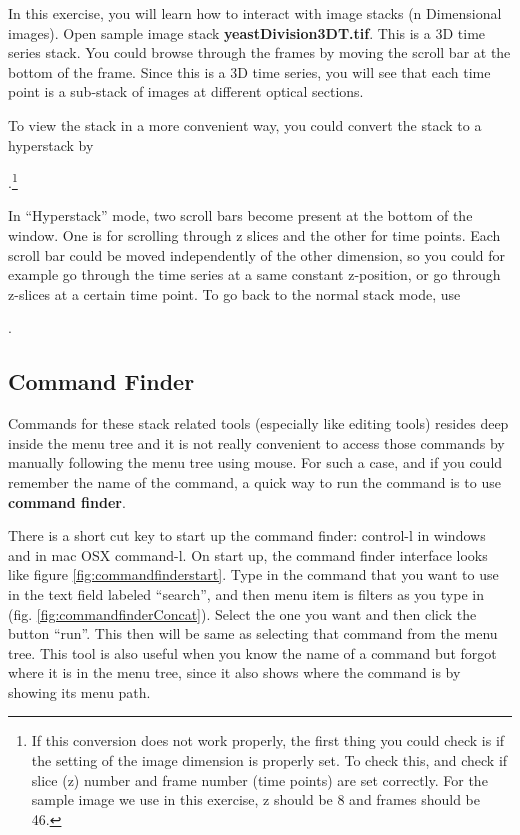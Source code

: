 \begin{indentexercise}{2}
  In this exercise, you will learn how to interact with image stacks (n
  Dimensional images).
  Open sample image stack \textbf{yeastDivision3DT.tif}.
  This is a 3D time series stack. You could browse through the frames by moving
  the scroll bar at the bottom of the frame.
  Since this is a 3D time series, you will see that each time point is a
  sub-stack of images at different optical sections. 
  
  To view the stack in a more
  convenient way, you could convert the stack to a hyperstack by 
  
  .\footnote{If this conversion does not work properly, the first thing you could
  check is if the setting of the image dimension is properly set.
  To check this,  and check if slice (z)
  number and frame number (time points) are set correctly.
  For the sample image we use in this exercise, z should be 8 and frames should
  be 46.}
  
   In ``Hyperstack'' mode, two scroll bars become present at the bottom of the
   window. One is for scrolling through z slices and the other for time points.
   Each scroll bar could be moved independently of the other dimension, so you
   could for example go through the time series at a same constant z-position,
   or go through z-slices at a certain time point.
   To go back to the normal stack mode, use 
   
   .
\end{indentexercise}

\subsection{Command Finder}

Commands for these stack related tools (especially like editing tools) resides deep inside the menu tree and it is not really convenient to access those commands by manually following the menu tree using mouse. For such a case, and if you could remember the name of the command, a quick way to run the command is to use \textbf{command finder}.

There is a short cut key to start up the command finder: control-l in windows and in mac OSX command-l. On start up, the command finder interface looks like figure \ref{fig:commandfinderstart}. Type in the command that you want to use in the text field labeled ``search'', and then menu item is filters as you type in (fig. \ref{fig:commandfinderConcat}). Select the one you want and then click the button ``run''. This then will be same as selecting that command from the menu tree. This tool is also useful when you know the name of a command but forgot where it is in the menu tree, since it also shows where the command is by showing its menu path. 

